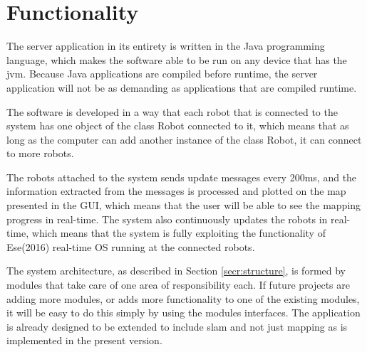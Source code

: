 \section{Functionality}
\label{secr:functionality}
The server application in its entirety is written in the Java programming language, which makes the software able to be run on any device that has the \acrlong{jvm}. Because Java applications are compiled before runtime, the server application will not be as demanding as applications that are compiled runtime. 

The software is developed in a way that each robot that is connected to the system has one object of the class Robot connected to it, which means that as long as the computer can add another instance of the class Robot, it can connect to more robots. 

The robots attached to the system sends update messages every 200ms, and the information extracted from the messages is processed and plotted on the map presented in the GUI, which means that the user will be able to see the mapping progress in real-time. The system also continuously updates the robots in real-time, which means that the system is fully exploiting the functionality of Ese(2016) real-time OS running at the connected robots.

The system architecture, as described in Section \ref{secr:structure}, is formed by modules that take care of one area of responsibility each. If future projects are adding more modules, or adds more functionality to one of the existing modules, it will be easy to do this simply by using the modules interfaces. The application is already designed to be extended to include \acrfull{slam} and not just mapping as is implemented in the present version.